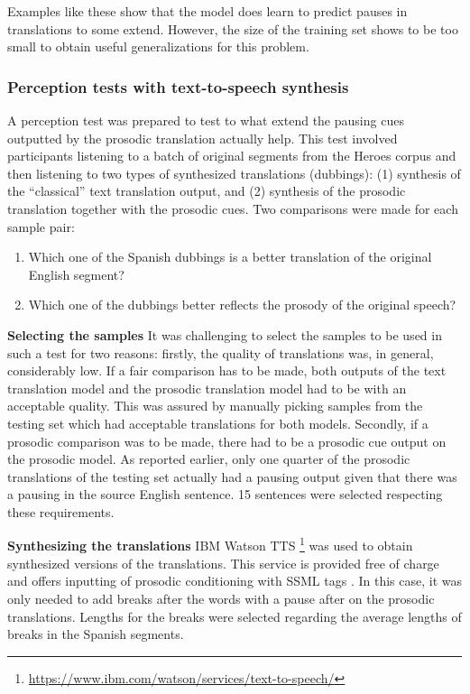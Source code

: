 Examples like these show that the model does learn to predict pauses in translations to some extend. However, the size of the training set shows to be too small to obtain useful generalizations for this problem. 

\subsubsection{Perception tests with text-to-speech synthesis}
A perception test was prepared to test to what extend the pausing cues outputted by the prosodic translation actually help. This test involved participants listening to a batch of original segments from the Heroes corpus and then listening to two types of synthesized translations (dubbings): (1) synthesis of the ``classical'' text translation output, and (2) synthesis of the prosodic translation together with the prosodic cues. Two comparisons were made for each sample pair: 

\begin{enumerate}
    \item Which one of the Spanish dubbings is a better translation of the original English segment? 
    \item Which one of the dubbings better reflects the prosody of the original speech?
\end{enumerate}


\textbf{Selecting the samples} It was challenging to select the samples to be used in such a test for two reasons: firstly, the quality of translations was, in general, considerably low. If a fair comparison has to be made, both outputs of the text translation model and the prosodic translation model had to be with an acceptable quality. This was assured by manually picking samples from the testing set which had acceptable translations for both models. Secondly, if a prosodic comparison was to be made, there had to be a prosodic cue output on the prosodic model. As reported earlier, only one quarter of the prosodic translations of the testing set actually had a pausing output given that there was a pausing in the source English sentence. 15 sentences were selected respecting these requirements. 

\textbf{Synthesizing the translations} IBM Watson TTS \footnote{\url{https://www.ibm.com/watson/services/text-to-speech/}} was used to obtain synthesized versions of the translations. This service is provided free of charge and offers inputting of prosodic conditioning with SSML tags \citep{ssml}. In this case, it was only needed to add breaks after the words with a pause after on the prosodic translations. Lengths for the breaks were selected regarding the average lengths of breaks in the Spanish segments. 

